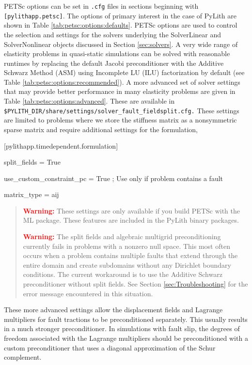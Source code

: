 PETSc options can be set in \texttt{.cfg} files in sections beginning
with \texttt{{[}pylithapp.petsc{]}}. The options of primary interest
in the case of PyLith are shown in Table \vref{tab:petsc:options:defaults}.
PETSc options are used to control the selection and settings for the
solvers underlying the SolverLinear and SolverNonlinear objects discussed
in Section \vref{sec:solvers}. A very wide range of elasticity problems
in quasi-static simulations can be solved with reasonable runtimes
by replacing the default Jacobi preconditioner with the Additive Schwarz
Method (ASM) using Incomplete LU (ILU) factorization by default (see
Table \vref{tab:petsc:options:recommended}). A more advanced set
of solver settings that may provide better performance in many elasticity
problems are given in Table \vref{tab:petsc:options:advanced}. These
are available in \texttt{\$PYLITH\_DIR/share/settings/solver\_fault\_fieldsplit.cfg.}
These settings are limited to problems where we store the stiffness
matrix as a nonsymmetric sparse matrix and require additional settings
for the formulation,
\begin{lyxcode}
{[}pylithapp.timedependent.formulation{]}

split\_fields = True

use\_custom\_constraint\_pc = True ; Use only if problem contains a fault

matrix\_type = aij\end{lyxcode}
\begin{quote}
\textbf{\textcolor{red}{Warning:}}\textbf{ }These settings are only
available if you build PETSc with the ML package. These features are
included in the PyLith binary packages.

\textbf{\textcolor{red}{Warning:}}\textbf{ }The split fields and algebraic
multigrid preconditioning currently fails in problems with a nonzero
null space. This most often occurs when a problem contains multiple
faults that extend through the entire domain and create subdomains
without any Dirichlet boundary conditions. The current workaround
is to use the Additive Schwarz preconditioner without split fields.
See Section \vref{sec:Troubleshooting} for the error message encountered
in this situation. 
\end{quote}
These more advanced settings allow the displacement fields and Lagrange
multipliers for fault tractions to be preconditioned separately. This
usually results in a much stronger preconditioner. In simulations
with fault slip, the degrees of freedom associated with the Lagrange
multipliers should be preconditioned with a custom preconditioner
that uses a diagonal approximation of the Schur complement.

